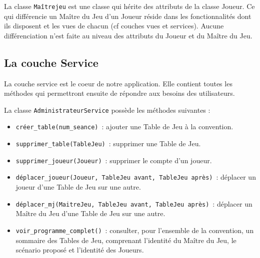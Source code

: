 \documentclass[11pt]{article}
\begin{document}
\bigbreak

La classe \texttt{Maîtrejeu} est une classe qui hérite des attributs de la classe Joueur. Ce qui différencie un Maître du Jeu d'un Joueur réside dans les fonctionnalités dont ils disposent et les vues de chacun (cf couches vues et services). Aucune différenciation n'est faite au niveau des attributs du Joueur et du Maître du Jeu.







\subsection{La couche Service}

La couche service est le coeur de notre application. Elle contient toutes les méthodes qui permettront ensuite de répondre aux besoins des utilisateurs.




\bigbreak


La classe \texttt{AdministrateurService} possède les méthodes suivantes :
\begin{itemize}[label=, font=\small]
    \item \texttt{créer\_table(num\_seance)}~: ajouter une Table de Jeu à la convention.
    \item \texttt{supprimer\_table(TableJeu)}~: supprimer une Table de Jeu.
    \item \texttt{supprimer\_joueur(Joueur)}~: supprimer le compte d'un joueur.
    \item \texttt{déplacer\_joueur(Joueur, TableJeu avant, TableJeu après)}~: déplacer un joueur d'une Table de Jeu sur une autre.
    \item \texttt{déplacer\_mj(MaitreJeu, TableJeu avant, TableJeu après)}~: déplacer un Maître du Jeu d'une Table de Jeu sur une autre.
    \item \texttt{voir\_programme\_complet()}~: consulter, pour l'ensemble de la convention, un sommaire des Tables de Jeu, comprenant l'identité du Maître du Jeu, le scénario proposé et l'identité des Joueurs.
\end{itemize}

\bigbreak
\end{document}
